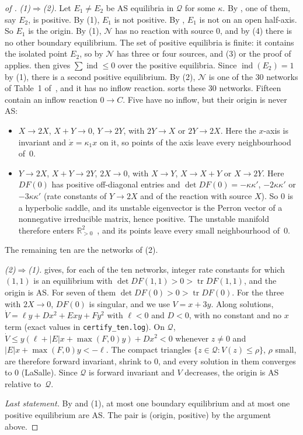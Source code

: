 \documentclass[11pt,a4paper]{report}
\providecommand{\R}{\mathbb{R}}
\newcommand{\Q}{\mathcal{Q}}
\newcommand{\Net}{\mathcal{N}}
\newcommand{\indx}{\operatorname{ind}}
\newcommand{\Trop}{\operatorname{tr}}
\begin{document}
\begin{proof}[of ]
\emph{(1)\(\Rightarrow\)(2).} Let \(E_1\neq E_2\) be AS equilibria in \(\Q\) for some \(\kappa\). By
, one of them, say \(E_2\), is positive. By (1), \(E_1\) is not positive. By
, \(E_1\) is not on an open half-axis. So \(E_1\) is the origin. By (1),
\(\Net\) has no reaction with source \(0\), and by (4) there is no other boundary equilibrium. The set of
positive equilibria is finite: it contains the isolated point \(E_2\), so by  \(\Net\) has three or
four sources, and (3) or the proof of  applies.  then gives
\(\sum\indx\le0\) over the positive equilibria. Since \(\indx(E_2)=1\) by (1), there is a second
positive equilibrium. By (2), \(\Net\) is one of the 30 networks of Table~1 of~\autocite{BBH2024}, and
it has no inflow reaction.  sorts these 30 networks. Fifteen contain an inflow reaction \(0\to C\).
Five have no inflow, but their origin is never AS:
\begin{itemize}
\item \(X\to2X\), \(X+Y\to0\), \(Y\to2Y\), with \(2Y\to X\) or \(2Y\to2X\). Here the \(x\)-axis is invariant and
\(\dot x=\kappa_1x\) on it, so points of the axis leave every neighbourhood of~\(0\).
\item \(Y\to2X\), \(X+Y\to2Y\), \(2X\to0\), with \(X\to Y\), \(X\to X+Y\) or \(X\to2Y\). Here \(DF(0)\) has positive
off-diagonal entries and \(\det DF(0)=-\kappa\kappa'\), \(-2\kappa\kappa'\) or \(-3\kappa\kappa'\) (rate constants of
\(Y\to2X\) and of the reaction with source \(X\)). So \(0\) is a hyperbolic saddle, and its unstable eigenvector is
the Perron vector of a nonnegative irreducible matrix, hence positive. The unstable manifold therefore enters
\(\R^2_{>0}\)~\autocite[§2.7]{Perko2001}, and its points leave every small neighbourhood of~\(0\).
\end{itemize}
The remaining ten are the networks of (2).

\emph{(2)\(\Rightarrow\)(1).}  gives, for each of the ten networks, integer rate constants for which
\((1,1)\) is an equilibrium with \(\det DF(1,1)>0>\Trop DF(1,1)\), and the origin is AS. For seven of them
\(\det DF(0)>0>\Trop DF(0)\). For the three with \(2X\to0\), \(DF(0)\) is singular, and we use \(V=x+3y\). Along
solutions, \(\dot V=\ell y+Dx^2+Exy+Fy^2\) with \(\ell<0\) and \(D<0\), with no constant and no \(x\) term (exact
values in \texttt{certify\_ten.log}). On \(\Q\), \(\dot V\le y(\ell+|E|x+\max(F,0)y)+Dx^2<0\) whenever \(z\neq0\) and
\(|E|x+\max(F,0)y<-\ell\). The compact triangles \(\{z\in\Q:V(z)\le\rho\}\), \(\rho\) small, are therefore forward
invariant, shrink to \(0\), and every solution in them converges to \(0\) (LaSalle). Since \(\Q\) is forward
invariant and \(V\) decreases, the origin is AS relative to~\(\Q\).

\emph{Last statement.} By  and (1), at most one boundary equilibrium and at most
one positive equilibrium are AS. The pair is (origin, positive) by the argument above.
\end{proof}
\end{document}
